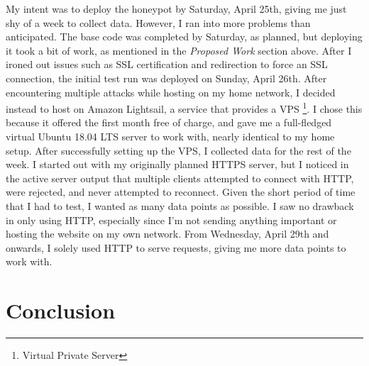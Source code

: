 \documentclass[12pt]{article}
\begin{document}
My intent was to deploy the honeypot by Saturday, April 25th, giving me just shy of a week to collect data.
However, I ran into more problems than anticipated.
The base code was completed by Saturday, as planned, but deploying it took a bit of work, as mentioned in the \textit{Proposed Work} section above.
After I ironed out issues such as SSL certification and redirection to force an SSL connection, the initial test run was deployed on Sunday, April 26th.
After encountering multiple attacks while hosting on my home network, I decided instead to host on Amazon Lightsail, a service that provides a VPS \footnote{Virtual Private Server}.
I chose this because it offered the first month free of charge, and gave me a full-fledged virtual Ubuntu 18.04 LTS server to work with, nearly identical to my home setup.
After successfully setting up the VPS, I collected data for the rest of the week.
I started out with my originally planned HTTPS server, but I noticed in the active server output that multiple clients attempted to connect with HTTP, were rejected, and never attempted to reconnect.
Given the short period of time that I had to test, I wanted as many data points as possible.
I saw no drawback in only using HTTP, especially since I'm not sending anything important or hosting the website on my own network.
From Wednesday, April 29th and onwards, I solely used HTTP to serve requests, giving me more data points to work with.


\section{Conclusion}


\clearpage
\printbibliography
\end{document}
